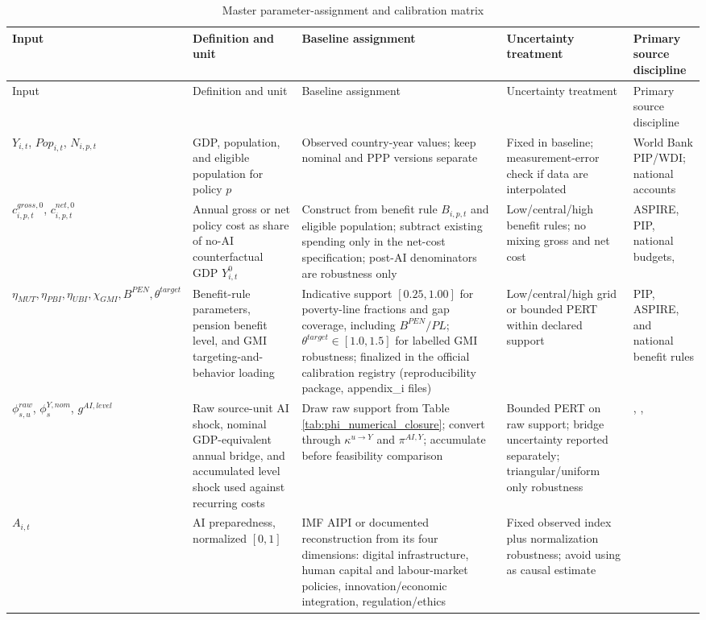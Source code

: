 \documentclass[11pt,a4paper]{article}
\begin{document}
\scriptsize
\begin{longtable}{p{}p{}p{}p{}p{}}
\caption{Master parameter-assignment and calibration matrix}\label{tab:master_calibration_matrix}\\
\toprule
Input & Definition and unit & Baseline assignment & Uncertainty treatment & Primary source discipline \\
\midrule
\endfirsthead
\toprule
Input & Definition and unit & Baseline assignment & Uncertainty treatment & Primary source discipline \\
\midrule
\endhead
$Y_{i,t}$, $Pop_{i,t}$, $N_{i,p,t}$ & GDP, population, and eligible population for policy $p$ & Observed country-year values; keep nominal and PPP versions separate & Fixed in baseline; measurement-error check if data are interpolated & World Bank PIP/WDI; national accounts \\
$c^{gross,0}_{i,p,t}$, $c^{net,0}_{i,p,t}$ & Annual gross or net policy cost as share of no-AI counterfactual GDP $Y^0_{i,t}$ & Construct from benefit rule $B_{i,p,t}$ and eligible population; subtract existing spending only in the net-cost specification; post-AI denominators are robustness only & Low/central/high benefit rules; no mixing gross and net cost & ASPIRE, PIP, national budgets, \citet{gentilini2020ubi} \\
$\eta_{MUT},\eta_{PBI},\eta_{UBI},\chi_{GMI},B^{PEN},\theta^{target}$ & Benefit-rule parameters, pension benefit level, and GMI targeting-and-behavior loading & Indicative support $[0.25,1.00]$ for poverty-line fractions and gap coverage, including $B^{PEN}/PL$; $\theta^{target}\in[1.0,1.5]$ for labelled GMI robustness; finalized in the official calibration registry (reproducibility package, appendix\_i files) & Low/central/high grid or bounded PERT within declared support & PIP, ASPIRE, and national benefit rules \\
$\phi^{raw}_{s,u}$, $\phi^{Y,nom}_s$, $g^{AI,level}$ & Raw source-unit AI shock, nominal GDP-equivalent annual bridge, and accumulated level shock used against recurring costs & Draw raw support from Table \ref{tab:phi_numerical_closure}; convert through $\kappa^{u\to Y}$ and $\pi^{AI,Y}$; accumulate before feasibility comparison & Bounded PERT on raw support; bridge uncertainty reported separately; triangular/uniform only robustness & \citet{acemoglu2024simple}, \citet{filippucci2024miracle}, \citet{oecd2025g7} \\
$A_{i,t}$ & AI preparedness, normalized $[0,1]$ & IMF AIPI or documented reconstruction from its four dimensions: digital infrastructure, human capital and labour-market policies, innovation/economic integration, regulation/ethics & Fixed observed index plus normalization robustness; avoid using as causal estimate & \citet{imf2024aipi,cazzaniga2024genai} \\

\end{longtable}
\end{document}
